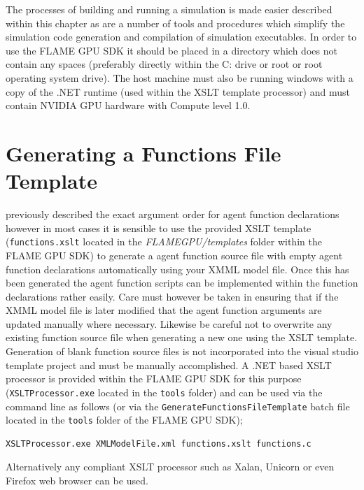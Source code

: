 \documentclass[11pt, a4paper, onecolumn, oneside]{report}
\begin{document}
The processes of building and running a simulation is made easier described within this chapter as are a number of tools and procedures which simplify the simulation code generation and compilation of simulation executables.
In order to use the FLAME GPU SDK it should be placed in a directory which does not contain any spaces (preferably directly within the C: drive or root or root operating system drive).
The host machine must also be running windows with a copy of the .NET runtime (used within the XSLT template processor) and must contain NVIDIA GPU hardware with Compute level 1.0.

\section{Generating a Functions File Template}
\label{sec:42}


 previously described the exact argument order for agent function declarations however in most cases it is sensible to use the provided XSLT template (\texttt{functions.xslt} located in the \emph{FLAMEGPU/templates} folder within the FLAME GPU SDK) to generate a agent function source file with empty agent function declarations automatically using your XMML model file.
Once this has been generated the agent function scripts can be implemented within the function declarations rather easily.
Care must however be taken in ensuring that if the XMML model file is later modified that the agent function arguments are updated manually where necessary.
Likewise be careful not to overwrite any existing function source file when generating a new one using the XSLT template.
Generation of blank function source files is not incorporated into the visual studio template project and must be manually accomplished.
A .NET based XSLT processor is provided within the FLAME GPU SDK for this purpose (\texttt{XSLTProcessor.exe} located in the \texttt{tools} folder) and can be used via the command line as follows (or via the \texttt{GenerateFunctionsFileTemplate} batch file located in the \texttt{tools} folder of the FLAME GPU SDK);

\begin{verbatim}
XSLTProcessor.exe XMLModelFile.xml functions.xslt functions.c
\end{verbatim}

Alternatively any compliant XSLT processor such as Xalan, Unicorn or even Firefox web browser can be used.
\end{document}

